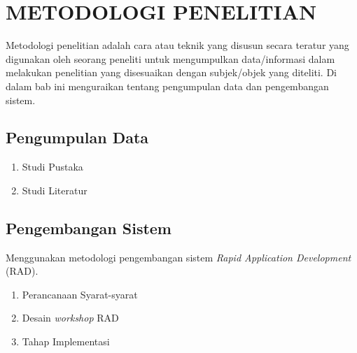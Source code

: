 
\chapter{METODOLOGI PENELITIAN}

Metodologi penelitian adalah cara atau teknik yang disusun
secara teratur yang digunakan oleh seorang peneliti untuk mengumpulkan
data/informasi dalam melakukan penelitian yang disesuaikan dengan subjek/objek yang diteliti. Di dalam bab ini menguraikan tentang pengumpulan data dan pengembangan sistem. 

\section{Pengumpulan Data}
	\begin{enumerate}
		\item Studi Pustaka
		\item Studi Literatur
	\end{enumerate}

\section{Pengembangan Sistem}
Menggunakan metodologi pengembangan sistem \emph{Rapid Application Development} (RAD).
	\begin{enumerate}
		\item Perancanaan Syarat-syarat
		\item Desain \emph{workshop} RAD
		\item Tahap Implementasi
	\end{enumerate}

